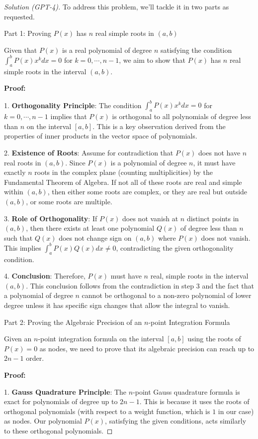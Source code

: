 \documentclass[11pt]{article}
\numberwithin{equation}{section}
\begin{document}
\begin{proof}[Solution (GPT-4)]
    To address this problem, we'll tackle it in two parts as requested.

 Part 1: Proving $P(x)$ has $n$ real simple roots in $(a, b)$

Given that $P(x)$ is a real polynomial of degree $n$ satisfying the condition $\int_a^b P(x)x^k dx = 0$ for $k = 0, \cdots, n-1$, we aim to show that $P(x)$ has $n$ real simple roots in the interval $(a, b)$.

\textbf{Proof:}

1. \textbf{Orthogonality Principle}: The condition $\int_a^b P(x)x^k dx = 0$ for $k = 0, \cdots, n-1$ implies that $P(x)$ is orthogonal to all polynomials of degree less than $n$ on the interval $[a, b]$. This is a key observation derived from the properties of inner products in the vector space of polynomials.

2. \textbf{Existence of Roots}: Assume for contradiction that $P(x)$ does not have $n$ real roots in $(a, b)$. Since $P(x)$ is a polynomial of degree $n$, it must have exactly $n$ roots in the complex plane (counting multiplicities) by the Fundamental Theorem of Algebra. If not all of these roots are real and simple within $(a, b)$, then either some roots are complex, or they are real but outside $(a, b)$, or some roots are multiple.

3. \textbf{Role of Orthogonality}: If $P(x)$ does not vanish at $n$ distinct points in $(a, b)$, then there exists at least one polynomial $Q(x)$ of degree less than $n$ such that $Q(x)$ does not change sign on $(a, b)$ where $P(x)$ does not vanish. This implies $\int_a^b P(x)Q(x) dx \neq 0$, contradicting the given orthogonality condition.

4. \textbf{Conclusion}: Therefore, $P(x)$ must have $n$ real, simple roots in the interval $(a, b)$. This conclusion follows from the contradiction in step 3 and the fact that a polynomial of degree $n$ cannot be orthogonal to a non-zero polynomial of lower degree unless it has specific sign changes that allow the integral to vanish.

 Part 2: Proving the Algebraic Precision of an $n$-point Integration Formula

Given an $n$-point integration formula on the interval $[a, b]$ using the roots of $P(x) = 0$ as nodes, we need to prove that its algebraic precision can reach up to $2n-1$ order.

\textbf{Proof:}

1. \textbf{Gauss Quadrature Principle}: The $n$-point Gauss quadrature formula is exact for polynomials of degree up to $2n-1$. This is because it uses the roots of orthogonal polynomials (with respect to a weight function, which is $1$ in our case) as nodes. Our polynomial $P(x)$, satisfying the given conditions, acts similarly to these orthogonal polynomials.


\end{proof}
\end{document}
